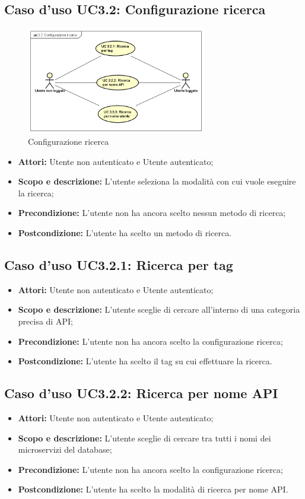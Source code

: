 \documentclass[12pt,a4paper,titlepage]{article}
\begin{document}
\subsection{Caso d'uso UC3.2: Configurazione ricerca}
\begin{figure}[H]
	\centering
	\includegraphics[width=0.7\textwidth]{UseCase/ConfigurazioneRicerca}
	\caption{Configurazione ricerca}
\end{figure}
\begin{itemize}
	\item \textbf{Attori: }Utente non autenticato e Utente autenticato;
	\item \textbf{Scopo e descrizione: }L'utente seleziona la modalità con cui vuole eseguire la ricerca;
	\item \textbf{Precondizione: }L'utente non ha ancora scelto nessun metodo di ricerca;
	\item \textbf{Postcondizione: }L'utente ha scelto un metodo di ricerca.
\end{itemize}
\subsection{Caso d'uso UC3.2.1: Ricerca per tag}
\begin{itemize}
	\item \textbf{Attori: }Utente non autenticato e Utente autenticato;
	\item \textbf{Scopo e descrizione: }L'utente sceglie di cercare all'interno di una categoria precisa di API;
	\item \textbf{Precondizione: }L'utente non ha ancora scelto la configurazione ricerca;
	\item \textbf{Postcondizione: }L'utente ha scelto il tag su cui effettuare la ricerca.
\end{itemize}
\subsection{Caso d'uso UC3.2.2: Ricerca per nome API}
\begin{itemize}
	\item \textbf{Attori: }Utente non autenticato e Utente autenticato;
	\item \textbf{Scopo e descrizione: }L'utente sceglie di cercare tra tutti i nomi dei microservizi del database;
	\item \textbf{Precondizione: }L'utente non ha ancora scelto la configurazione ricerca;
	\item \textbf{Postcondizione: }L'utente ha scelto la modalità di ricerca per nome API.
\end{itemize}
\end{document}
